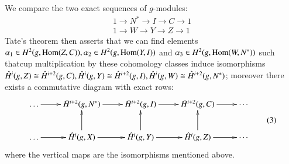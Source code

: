  We compare the two exact sequences of $g$-modules:
 \begin{gather*}
1 \longrightarrow N^* \longrightarrow I \longrightarrow C \longrightarrow
1  \tag{1}\label{c3:eq1} \\ 
1 \longrightarrow W \longrightarrow Y \longrightarrow Z
\longrightarrow 1  \tag{2}\label{c3:eq2}  
 \end{gather*} 
 Tate's theorem then asserts that we can find elements $\alpha_1 \in
 H^2 (g,\break \Hom (Z,C)), \alpha_2 \in H^2 (g, \Hom (Y, I))$ and $\alpha_3
 \in H^2 (g, \operatorname{Hom} (W, N^*))$ such that\pageoriginale cup
 multiplication by these 
 cohomology classes induce isomorphisms $\hat{H}^i(g,Z) \cong
 \hat{H}^{i+2}(g,C), \hat{H}^i (g,Y) \cong \hat{H}^{i+2}(g,I),
 \hat{H}^i(g,W) \cong \hat{H}^{i+2}\break(g,N^*)$; moreover there exists a
 commutative diagram with exact rows: 
\begin{equation*}
\vcenter{\xymatrix{
\ldots \ar[r] & \bar{H}^{i+2} (g, N^\ast) \ar[r] & \bar{H}^{i+2} (g,I)
\ar[r]& \bar{H}^{i+2} (g,C) \ar[r] & \cdots \\
\ldots \ar[r] & \hat{H}^i (g,X) \ar[r] \ar[u] & \hat{H}^i (g,Y) \ar[u]
\ar[r] &  \hat{H}^i (g,Z) \ar[r] \ar[u] & \cdots
}} \tag{3}\label{c3:eq3} 
\end{equation*}
 where the vertical maps are the isomorphisms mentioned above.
 
